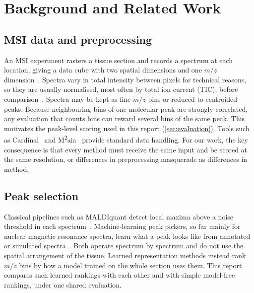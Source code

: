 \section{Background and Related Work}
\label{sec:background}

\subsection{MSI data and preprocessing}
An MSI experiment rasters a tissue section and records a spectrum at each
location, giving a data cube with two spatial dimensions and one $m/z$
dimension~\citep{caprioli1997maldi,buchberger2018mass}. Spectra vary in total
intensity between pixels for technical reasons, so they are usually
normalised, most often by total ion current (TIC), before
comparison~\citep{deininger2011normalization}. Spectra may be kept as fine
$m/z$ bins or reduced to centroided peaks. Because neighbouring bins of one
molecular peak are strongly correlated, any evaluation that counts bins can
reward several bins of the same peak. This motivates the peak-level scoring
used in this report (\cref{sec:evaluation}). Tools such as
Cardinal~\citep{bemis2015cardinal} and M\textsuperscript{2}aia~\citep{cordes2021m2aia}
provide standard data handling.
For our work, the key consequence is that every method must receive the same
input and be scored at the same resolution, or differences in preprocessing
masquerade as differences in method.

\subsection{Peak selection}
Classical pipelines such as MALDIquant detect local maxima above a noise
threshold in each spectrum~\citep{gibb2012maldiquant}. Machine-learning peak
pickers, so far mainly for nuclear magnetic resonance spectra, learn what a
peak looks like from annotated or simulated
spectra~\citep{li2022machinelearningpeakpicking}. Both operate spectrum by
spectrum and do not use the spatial arrangement of the tissue. Learned
representation methods instead rank $m/z$ bins by how a model trained on the
whole section uses them. This report compares such learned rankings with each
other and with simple model-free rankings, under one shared evaluation.

